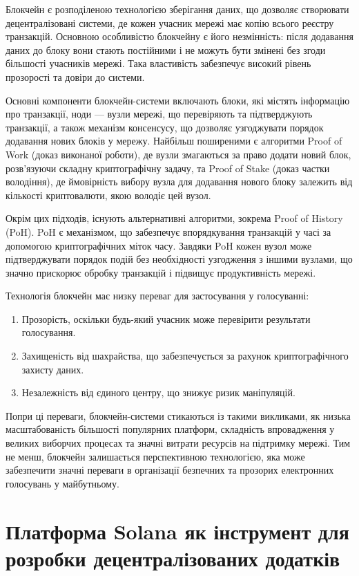 \documentclass[14pt]{extreport}
\begin{document}
  Блокчейн є розподіленою технологією зберігання даних, що дозволяє створювати децентралізовані системи, де кожен учасник мережі має копію всього реєстру транзакцій. Основною особливістю блокчейну є його незмінність: після додавання даних до блоку вони стають постійними і не можуть бути змінені без згоди більшості учасників мережі. Така властивість забезпечує високий рівень прозорості та довіри до системи.

  Основні компоненти блокчейн-системи включають блоки, які містять інформацію про транзакції, ноди — вузли мережі, що перевіряють та підтверджують транзакції, а також механізм консенсусу, що дозволяє узгоджувати порядок додавання нових блоків у мережу. Найбільш поширеними є алгоритми Proof of Work (доказ виконаної роботи), де вузли змагаються за право додати новий блок, розв’язуючи складну криптографічну задачу, та Proof of Stake (доказ частки володіння), де ймовірність вибору вузла для додавання нового блоку залежить від кількості криптовалюти, якою володіє цей вузол.
  
  Окрім цих підходів, існують альтернативні алгоритми, зокрема Proof of History (PoH). PoH є механізмом, що забезпечує впорядкування транзакцій у часі за допомогою криптографічних міток часу. Завдяки PoH кожен вузол може підтверджувати порядок подій без необхідності узгодження з іншими вузлами, що значно прискорює обробку транзакцій і підвищує продуктивність мережі.

  Технологія блокчейн має низку переваг для застосування у голосуванні:
  \begin{enumerate}
    \item Прозорість, оскільки будь-який учасник може перевірити результати голосування.
    \item Захищеність від шахрайства, що забезпечується за рахунок криптографічного захисту даних.
    \item Незалежність від єдиного центру, що знижує ризик маніпуляцій.
  \end{enumerate}

  Попри ці переваги, блокчейн-системи стикаються із такими викликами, як низька масштабованість більшості популярних платформ, складність впровадження у великих виборчих процесах та значні витрати ресурсів на підтримку мережі. Тим не менш, блокчейн залишається перспективною технологією, яка може забезпечити значні переваги в організації безпечних та прозорих електронних голосувань у майбутньому.
  
  \section{Платформа Solana як інструмент для розробки децентралізованих додатків}
  
\end{document}

